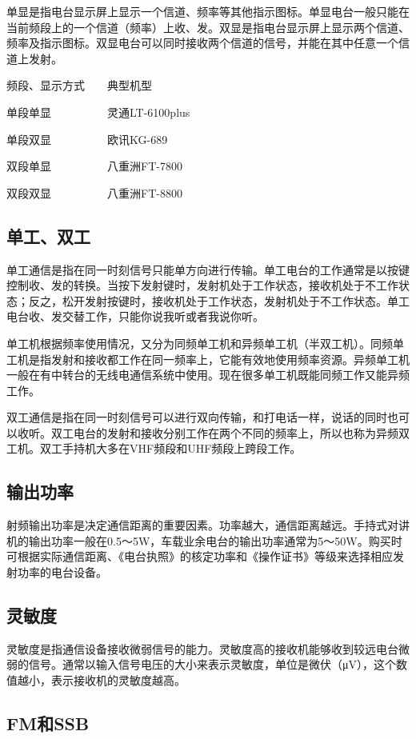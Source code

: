 \documentclass[12pt,UTF8]{ctexbook}
\begin{document}
单显是指电台显示屏上显示一个信道、频率等其他指示图标。单显电台一般只能在当前频段上的一个信道（频率）上收、发。双显是指电台显示屏上显示两个信道、频率及指示图标。双显电台可以同时接收两个信道的信号，并能在其中任意一个信道上发射。

频段、显示方式　　典型机型

单段单显　　　　　灵通LT-6100plus

单段双显　　　　　欧讯KG-689

双段单显　　　　　八重洲FT-7800

双段双显　　　　　八重洲FT-8800

\subsection{单工、双工}

单工通信是指在同一时刻信号只能单方向进行传输。单工电台的工作通常是以按键控制收、发的转换。当按下发射键时，发射机处于工作状态，接收机处于不工作状态；反之，松开发射按键时，接收机处于工作状态，发射机处于不工作状态。单工电台收、发交替工作，只能你说我听或者我说你听。

单工机根据频率使用情况，又分为同频单工机和异频单工机（半双工机）。同频单工机是指发射和接收都工作在同一频率上，它能有效地使用频率资源。异频单工机一般在有中转台的无线电通信系统中使用。现在很多单工机既能同频工作又能异频工作。

双工通信是指在同一时刻信号可以进行双向传输，和打电话一样，说话的同时也可以收听。双工电台的发射和接收分别工作在两个不同的频率上，所以也称为异频双工机。双工手持机大多在VHF频段和UHF频段上跨段工作。

\subsection{输出功率}

射频输出功率是决定通信距离的重要因素。功率越大，通信距离越远。手持式对讲机的输出功率一般在0.5～5W，车载业余电台的输出功率通常为5～50W。购买时可根据实际通信距离、《电台执照》的核定功率和《操作证书》等级来选择相应发射功率的电台设备。

\subsection{灵敏度}

灵敏度是指通信设备接收微弱信号的能力。灵敏度高的接收机能够收到较远电台微弱的信号。通常以输入信号电压的大小来表示灵敏度，单位是微伏（μV），这个数值越小，表示接收机的灵敏度越高。

\subsection{FM和SSB}
\end{document}
